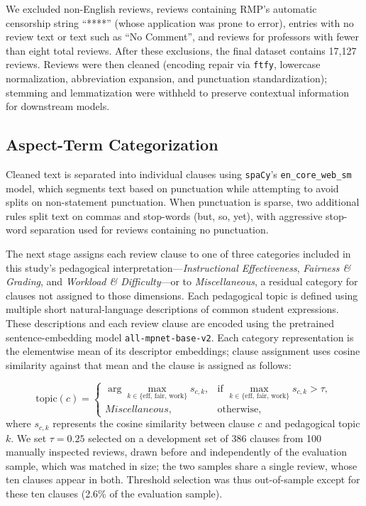 \documentclass[fleqn,10pt]{JLA_article}
\begin{document}
We excluded non-English reviews, reviews containing RMP's automatic censorship string ``****'' (whose application was prone to error), entries with no review text or text such as ``No Comment'', and reviews for professors with fewer than eight total reviews. After these exclusions, the final dataset contains 17,127 reviews. Reviews were then cleaned (encoding repair via \texttt{ftfy}, lowercase normalization, abbreviation expansion, and punctuation standardization); stemming and lemmatization were withheld to preserve contextual information for downstream models.

\subsection{Aspect-Term Categorization}

Cleaned text is separated into individual clauses using \texttt{spaCy}'s \texttt{en\_core\_web\_sm} model, which segments text based on punctuation while attempting to avoid splits on non-statement punctuation. When punctuation is sparse, two additional rules split text on commas and stop-words (but, so, yet), with aggressive stop-word separation used for reviews containing no punctuation.

The next stage assigns each review clause to one of three categories included in this study’s pedagogical interpretation---\textit{Instructional Effectiveness}, \textit{Fairness \& Grading}, and \textit{Workload \& Difficulty}---or to \textit{Miscellaneous}, a residual category for clauses not assigned to those dimensions. Each pedagogical topic is defined using multiple short natural-language descriptions of common student expressions. These descriptions and each review clause are encoded using the pretrained sentence-embedding model \texttt{all-mpnet-base-v2}. Each category representation is the elementwise mean of its descriptor
embeddings; clause assignment uses cosine similarity against that mean and the clause is assigned as follows:

\begin{equation}
\text{topic}(c) =
\begin{cases}
\displaystyle \arg\max_{k \in \{\text{eff},\,\text{fair},\,\text{work}\}} s_{c,k}, & \text{if } \max_{k \in \{\text{eff},\,\text{fair},\,\text{work}\}} s_{c,k} > \tau, \\
\textit{Miscellaneous}, & \text{otherwise},
\end{cases}
\end{equation}
where $s_{c,k}$ represents the cosine similarity between clause $c$ and pedagogical topic $k$. We set $\tau=0.25$ selected on a development set of 386 clauses from 100 manually inspected reviews, drawn before and independently of the evaluation
sample, which was matched in size; the two samples share a single review, whose
ten clauses appear in both. Threshold selection was thus out-of-sample except
for these ten clauses (2.6\% of the evaluation sample).
\end{document}
